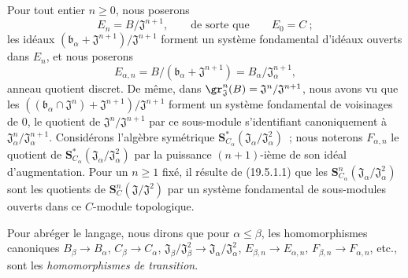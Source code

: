 
\begin{env}[19.5.6.2]
\label{0.19.5.6.2-fr}
Pour tout entier $n\geq0$, nous poserons
\[
  E_n=B/\mathfrak J^{n+1},
  \qquad\text{de sorte que}\qquad E_0=C~;
\]
les idéaux $(\mathfrak b_\alpha+\mathfrak J^{n+1})/\mathfrak J^{n+1}$ forment
un système fondamental d'idéaux ouverts dans $E_n$, et nous poserons
\[
  E_{\alpha,n}=B/(\mathfrak b_\alpha+\mathfrak J^{n+1})
  =B_\alpha/\mathfrak J_\alpha^{n+1},
\]
anneau quotient discret. De même, dans
$\gr_{\mathfrak J}^n(B)=\mathfrak J^n/\mathfrak J^{n+1}$, nous avons vu que les
$((\mathfrak b_\alpha\cap\mathfrak J^n)+\mathfrak J^{n+1})/
\mathfrak J^{n+1}$ forment un système fondamental de voisinages de $0$, le
quotient de $\mathfrak J^n/\mathfrak J^{n+1}$ par ce sous-module s'identifiant
canoniquement à $\mathfrak J_\alpha^n/\mathfrak J_\alpha^{n+1}$. Considérons
l'algèbre symétrique
$\mathbf S_{C_\alpha}^*(\mathfrak J_\alpha/\mathfrak J_\alpha^2)$~; nous
noterons $F_{\alpha,n}$ le quotient de
$\mathbf S_{C_\alpha}^*(\mathfrak J_\alpha/\mathfrak J_\alpha^2)$ par la
puissance $(n+1)$-ième de son idéal d'augmentation. Pour un $n\geq1$ fixé, il
résulte de (19.5.1.1) que les
$\mathbf S_{C_\alpha}^n(\mathfrak J_\alpha/\mathfrak J_\alpha^2)$ sont les
quotients de $\mathbf S_C^n(\mathfrak J/\mathfrak J^2)$ par un système
fondamental de sous-modules ouverts dans ce $C$-module topologique.

Pour abréger le langage, nous dirons que pour $\alpha\leq\beta$, les
homomorphismes canoniques $B_\beta\to B_\alpha$, $C_\beta\to C_\alpha$,
$\mathfrak J_\beta/\mathfrak J_\beta^2\to
\mathfrak J_\alpha/\mathfrak J_\alpha^2$, $E_{\beta,n}\to E_{\alpha,n}$,
$F_{\beta,n}\to F_{\alpha,n}$, etc., sont les \emph{homomorphismes de
transition}.
\end{env}

